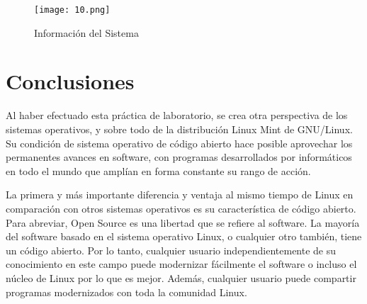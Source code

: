 \documentclass[
  letterpaper, 
  maincolor=black,
  sectioncolor=black!90,
  subsectioncolor=black!70,
  itemtextcolor=black!40,
]{fortysecondscv}
\begin{document}
\begin{center}
    \begin{figure}[H]
    \centering
    \texttt{[image: 10.png]}
    \caption{Información del Sistema}
    \label{fig:10.png}
    \end{figure}
\end{center}

\newpage
\section{Conclusiones}

{\Large 
Al haber efectuado esta práctica de laboratorio, se crea otra perspectiva de los sistemas operativos, y sobre todo de la distribución Linux Mint de GNU/Linux. 
Su condición de sistema operativo de código abierto hace posible aprovechar los permanentes avances en software, con programas desarrollados por informáticos en todo el mundo que amplían en forma constante su rango de acción.}

{\Large 
La primera y más importante diferencia y ventaja al mismo tiempo de Linux en comparación con otros sistemas operativos es su característica de código abierto. Para abreviar, Open Source es una libertad que se refiere al software. La mayoría del software basado en el sistema operativo Linux, o cualquier otro también, tiene un código abierto. Por lo tanto, cualquier usuario independientemente de su conocimiento en este campo puede modernizar fácilmente el software o incluso el núcleo de Linux por lo que es mejor. Además, cualquier usuario puede compartir programas modernizados con toda la comunidad Linux.}

\newpage


\end{document}
